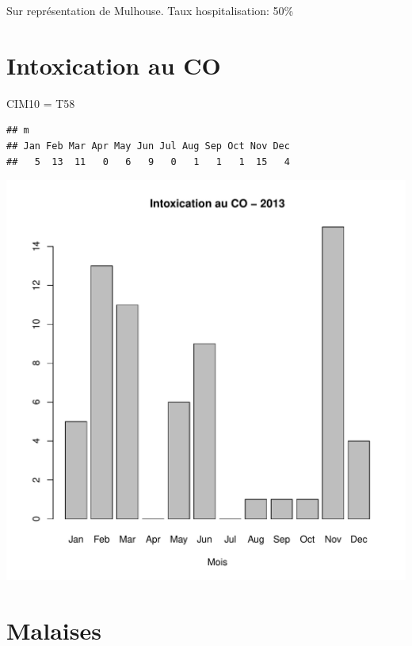 \documentclass[12pt,english,french,twoside]{book}\usepackage[]{graphicx}\usepackage[]{color}
\makeatletter
\def\maxwidth{ %
  \ifdim\Gin@nat@width>\linewidth
    \linewidth
  \else
    \Gin@nat@width
  \fi
}
\newenvironment{kframe}{%
 \def\at@end@of@kframe{}%
 \ifinner\ifhmode%
  \def\at@end@of@kframe{\end{minipage}}%
  \begin{minipage}{\columnwidth}%
 \fi\fi%
 \def\FrameCommand##1{\hskip\@totalleftmargin \hskip-\fboxsep
 \colorbox{shadecolor}{##1}\hskip-\fboxsep
     \hskip-\linewidth \hskip-\@totalleftmargin \hskip\columnwidth}%
 \MakeFramed {\advance\hsize-\width
   \@totalleftmargin\z@ \linewidth\hsize
   \@setminipage}}%
 {\par\unskip\endMakeFramed%
 \at@end@of@kframe}
\newenvironment{knitrout}{}{} %
\makeatother
\begin{document}
Sur représentation de Mulhouse. 
Taux hospitalisation: 50\%


\section{Intoxication au CO}

CIM10 = T58

\begin{knitrout}
\color{fgcolor}\begin{kframe}
\begin{verbatim}
## m
## Jan Feb Mar Apr May Jun Jul Aug Sep Oct Nov Dec 
##   5  13  11   0   6   9   0   1   1   1  15   4
\end{verbatim}
\end{kframe}
\includegraphics[width=\maxwidth]{figure/co} 

\end{knitrout}



\section{Malaises}
\end{document}
